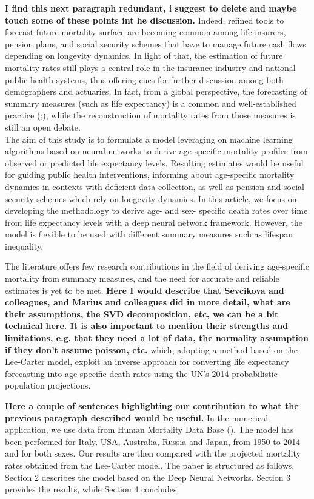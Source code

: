 \documentclass[a4,11pt]{article}
\begin{document}
\textbf{I find this next paragraph redundant, i suggest to delete and maybe touch some of these points int he discussion.} Indeed, refined tools to forecast future mortality surface are becoming common among life insurers, pension plans, and social security schemes that have to manage future cash flows depending on longevity dynamics. In light of that, the estimation of future mortality rates still plays a central role in the insurance industry and national public health systems, thus offering cues for further discussion among both demographers and actuaries. In fact, from a global perspective, the forecasting of summary measures (such as life expectancy) is a common and well-established practice (\cite{Miller86};\cite{Lee93}), while the reconstruction of mortality rates from those measures is still an open debate.\\

The aim of this study is to formulate a model leveraging on machine learning algorithms based on neural networks to derive age-specific mortality profiles from observed or predicted life expectancy levels. Resulting estimates would be useful for guiding public health interventions, informing about age-specific mortality dynamics in contexts with deficient data collection, as well as pension and social security schemes which rely on longevity dynamics. In this article, we focus on developing the methodology to derive age- and sex- specific death rates over time from life expectancy levels with a deep neural network framework. However, the model is flexible to be used with different summary measures such as lifespan inequality.

The literature offers few research contributions in the field of deriving age-specific mortality from summary measures, and the need for accurate and reliable estimates is yet to be met. \textbf{Here I would describe that  Sevcikova and colleagues, and Marius and colleagues did in more detail, what are their assumptions, the SVD decomposition, etc, we can be a bit technical here. It is also important to mention their strengths and limitations, e.g. that they need a lot of data, the normality assumption if they don't assume poisson, etc.}  \cite{Sevcikova} which, adopting a method based on the Lee-Carter model, exploit an inverse approach for converting life expectancy forecasting into age-specific death rates using the UN’s 2014 probabilistic population projections. 


\textbf{Here a couple of sentences highlighting our contribution to what the previous paragraph described would be useful.}
In the numerical application, we use data from Human Mortality Data Base (\cite{HM}). The model has been performed for Italy, USA, Australia, Russia and Japan, from 1950 to 2014 and for both sexes. Our results are then compared with the projected mortality rates obtained from the Lee-Carter model.
The paper is structured as follows. Section 2 describes the model based on the Deep Neural Networks. Section 3 provides the results, while Section 4 concludes.
\end{document}
